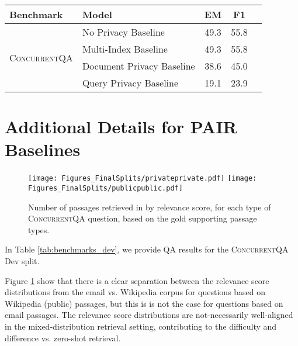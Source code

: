 \documentclass{article}
\newcommand{\datasetname}{\textsc{ConcurrentQA}\xspace}
\newcommand{\problemshortname}{\textsc{PAIR}\xspace}
\begin{document}
\begin{table*}[t!]
    \begin{center}
\normalsize
    \begin{tabular}{llccc}
    \toprule
    Benchmark   &  Model  &    EM  &   F1  \\
    \midrule
    \multirow{4}{*}{\datasetname}
    &  No Privacy Baseline         & 49.3 & 55.8  \\
    &  Multi-Index Baseline    & 49.3 & 55.8  \\
    &  Document Privacy Baseline & 38.6 & 45.0   \\
    &  Query Privacy  Baseline  & 19.1 & 23.9   \\
    \bottomrule
    \end{tabular}\normalsize
    \caption{Multi-hop QA datasets using MDR under each privacy setting. Here we include results for the \datasetname Dev split.}
    \vspace{-2mm}
    \label{tab:benchmarks_dev}
    \end{center}
\end{table*}

\section{Additional Details for \problemshortname Baselines}



\begin{figure}[t!]
    \centering
    \texttt{[image: Figures\_FinalSplits/privateprivate.pdf]}
    \texttt{[image: Figures\_FinalSplits/publicpublic.pdf]}
    \caption[width=0.9\linewidth]{Number of passages retrieved in  by relevance score, for each type of \datasetname question, based on the gold supporting passage types.} 
    \label{fig:relevancescores}
\end{figure}


In Table \ref{tab:benchmarks_dev}, we provide QA results for the \datasetname Dev split. 

Figure \ref{fig:relevancescores} show that there is a clear separation between the relevance score distributions from the email vs. Wikipedia corpus for questions based on Wikipedia (public) passages, but this is is not the case for questions based on email passages. The relevance score distributions are not-necessarily well-aligned in the mixed-distribution retrieval setting, contributing to the difficulty and difference vs. zero-shot retrieval.
\end{document}
